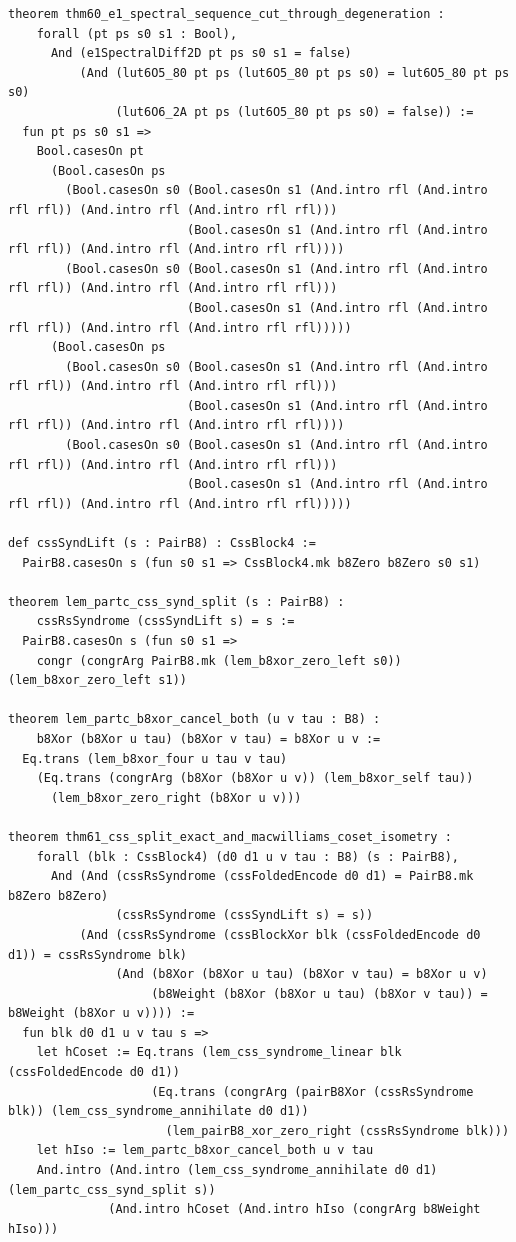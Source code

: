 \documentclass[11pt,letterpaper]{article}
\theoremstyle{spectralthm}
\begin{document}
\begin{lstlisting}[language=Lean4,caption={Standalone Pure Init.Prelude Term-Mode Lean 4 Kernel Suite (thm30--thm61, v0.0.0, 0 sorry, 0 axioms).},label={lst:lean_unified}]
theorem thm60_e1_spectral_sequence_cut_through_degeneration :
    forall (pt ps s0 s1 : Bool),
      And (e1SpectralDiff2D pt ps s0 s1 = false)
          (And (lut6O5_80 pt ps (lut6O5_80 pt ps s0) = lut6O5_80 pt ps s0)
               (lut6O6_2A pt ps (lut6O5_80 pt ps s0) = false)) :=
  fun pt ps s0 s1 =>
    Bool.casesOn pt
      (Bool.casesOn ps
        (Bool.casesOn s0 (Bool.casesOn s1 (And.intro rfl (And.intro rfl rfl)) (And.intro rfl (And.intro rfl rfl)))
                         (Bool.casesOn s1 (And.intro rfl (And.intro rfl rfl)) (And.intro rfl (And.intro rfl rfl))))
        (Bool.casesOn s0 (Bool.casesOn s1 (And.intro rfl (And.intro rfl rfl)) (And.intro rfl (And.intro rfl rfl)))
                         (Bool.casesOn s1 (And.intro rfl (And.intro rfl rfl)) (And.intro rfl (And.intro rfl rfl)))))
      (Bool.casesOn ps
        (Bool.casesOn s0 (Bool.casesOn s1 (And.intro rfl (And.intro rfl rfl)) (And.intro rfl (And.intro rfl rfl)))
                         (Bool.casesOn s1 (And.intro rfl (And.intro rfl rfl)) (And.intro rfl (And.intro rfl rfl))))
        (Bool.casesOn s0 (Bool.casesOn s1 (And.intro rfl (And.intro rfl rfl)) (And.intro rfl (And.intro rfl rfl)))
                         (Bool.casesOn s1 (And.intro rfl (And.intro rfl rfl)) (And.intro rfl (And.intro rfl rfl)))))

def cssSyndLift (s : PairB8) : CssBlock4 :=
  PairB8.casesOn s (fun s0 s1 => CssBlock4.mk b8Zero b8Zero s0 s1)

theorem lem_partc_css_synd_split (s : PairB8) :
    cssRsSyndrome (cssSyndLift s) = s :=
  PairB8.casesOn s (fun s0 s1 =>
    congr (congrArg PairB8.mk (lem_b8xor_zero_left s0)) (lem_b8xor_zero_left s1))

theorem lem_partc_b8xor_cancel_both (u v tau : B8) :
    b8Xor (b8Xor u tau) (b8Xor v tau) = b8Xor u v :=
  Eq.trans (lem_b8xor_four u tau v tau)
    (Eq.trans (congrArg (b8Xor (b8Xor u v)) (lem_b8xor_self tau))
      (lem_b8xor_zero_right (b8Xor u v)))

theorem thm61_css_split_exact_and_macwilliams_coset_isometry :
    forall (blk : CssBlock4) (d0 d1 u v tau : B8) (s : PairB8),
      And (And (cssRsSyndrome (cssFoldedEncode d0 d1) = PairB8.mk b8Zero b8Zero)
               (cssRsSyndrome (cssSyndLift s) = s))
          (And (cssRsSyndrome (cssBlockXor blk (cssFoldedEncode d0 d1)) = cssRsSyndrome blk)
               (And (b8Xor (b8Xor u tau) (b8Xor v tau) = b8Xor u v)
                    (b8Weight (b8Xor (b8Xor u tau) (b8Xor v tau)) = b8Weight (b8Xor u v)))) :=
  fun blk d0 d1 u v tau s =>
    let hCoset := Eq.trans (lem_css_syndrome_linear blk (cssFoldedEncode d0 d1))
                    (Eq.trans (congrArg (pairB8Xor (cssRsSyndrome blk)) (lem_css_syndrome_annihilate d0 d1))
                      (lem_pairB8_xor_zero_right (cssRsSyndrome blk)))
    let hIso := lem_partc_b8xor_cancel_both u v tau
    And.intro (And.intro (lem_css_syndrome_annihilate d0 d1) (lem_partc_css_synd_split s))
              (And.intro hCoset (And.intro hIso (congrArg b8Weight hIso)))


\end{lstlisting}
\end{document}
